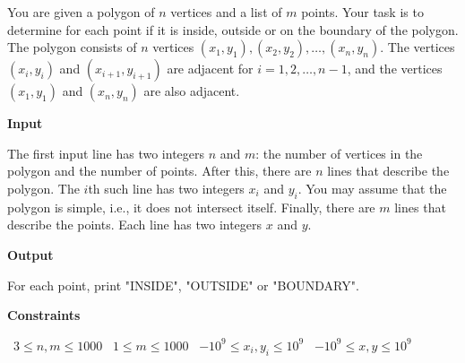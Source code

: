 You are given a polygon of $n$ vertices and a list of $m$ points. Your task is to determine for each point if it is inside, outside or on the boundary of the polygon.
The polygon consists of $n$ vertices $(x_1,y_1),(x_2,y_2),\dots,(x_n,y_n)$. The vertices $(x_i,y_i)$ and $(x_{i+1},y_{i+1})$ are adjacent for $i=1,2,\dots,n-1$, and the vertices $(x_1,y_1)$ and $(x_n,y_n)$ are also adjacent.

\vspace{0.3cm}\noindent\textbf{Input}

The first input line has two integers $n$ and $m$: the number of vertices in the polygon and the number of points.
After this, there are $n$ lines that describe the polygon. The $i$th such line has two integers $x_i$ and $y_i$.
You may assume that the polygon is simple, i.e., it does not intersect itself.
Finally, there are $m$ lines that describe the points. Each line has two integers $x$ and $y$.

\vspace{0.3cm}\noindent\textbf{Output}

For each point, print "INSIDE", "OUTSIDE" or "BOUNDARY".

\vspace{0.3cm}\noindent\textbf{Constraints}

\textbullet\ $3 \le n,m \le 1000$
\textbullet\ $1 \le m \le 1000$
\textbullet\ $-10^9 \le x_i, y_i \le 10^9$
\textbullet\ $-10^9 \le x, y \le 10^9$